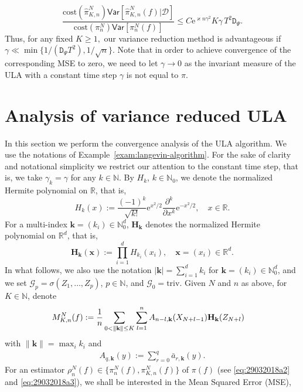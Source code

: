 \documentclass[bj]{imsart}
\def\PVar{\mathsf{Var}}
\def\nset{\mathbb{N}}
\def\rme{\mathrm{e}}
\def\TrainSet{\mathcal{D}}
\begin{document}
\begin{equation}
\label{eq:cost_theoretical}
\frac{\mathrm{cost}(\widehat \pi_{K,n}^N) \PVar[\widehat \pi_{K,n}^N(f)|\TrainSet]}{\mathrm{cost}(\pi_{n}^N)\PVar[\pi_{n}^N(f)]}\leq C \rme^{\varkappa n\gamma^2} K \gamma \, T^2 \mathtt{D}_\Psi.
\end{equation}
Thus, for any fixed $K\geq 1,$  our variance reduction method is advantageous if $\gamma\ll\min\{1/(\mathtt{D}_\Psi T^2),1/\sqrt{n}\}.$  Note that in order to achieve convergence of the corresponding MSE to zero, we need to let $\gamma\to 0$ as the invariant measure of the ULA with a constant time step $\gamma$ is not equal to $\pi.$
\section{Analysis of variance reduced ULA}\label{sec:ula_analysis}
In this section we perform the convergence analysis of the ULA algorithm. We use the notations of Example~\ref{exam:langevin-algorithm}. For the sake of clarity and notational simplicity we restrict our attention to the constant time step, that is, we take $\gamma_k =\gamma$ for any $k \in \nset$.
By $H_k$, $k\in\mathbb N_0$,
we denote the normalized Hermite polynomial on $\mathbb R$, that is,
$$
H_k(x):=\frac{(-1)^k}{\sqrt{k!}}\rme^{x^2/2}\frac{\partial^k}{\partial x^k}\rme^{-x^2/2},
\quad x\in\mathbb R.
$$
For a multi-index $\mathbf{k}=(k_i)\in\mathbb N_0^d$,
$\mathbf{H}_\mathbf{k}$ denotes the normalized Hermite polynomial on $\mathbb R^d$, that is,
$$
\mathbf{H}_\mathbf{k}(\mathbf{x}):=\prod_{i=1}^d H_{k_i}(x_i),\quad \mathbf{x}=(x_i)\in\mathbb R^d.
$$
In what follows, we also use the notation
$|\mathbf{k}|=\sum_{i=1}^d k_i$ for $\mathbf{k}=(k_i)\in\mathbb N_0^d$,
and we set $\mathcal G_p=\sigma(Z_1,\ldots,Z_p)$, $p\in\mathbb N$, and $\mathcal G_0=\mathrm{triv}$.
Given $N$ and $n$ as above, for $K\in\mathbb N$, denote
\begin{align}
M_{K,n}^N(f) & :=\frac{1}{n}\sum_{ 0<\|\mathbf{k}\|\le K}\sum_{l=1}^{n}A_{n-l,\mathbf{k}}(X_{N+l-1})\mathbf{H}_\mathbf{k}(Z_{N+l})
\label{eq:29032018a5}
\notag
\end{align}
with \(\|\mathbf{k}\|=\max_{i} k_i\) and
\begin{eqnarray}
\label{eq:A-ula}
A_{q,\mathbf{k}}(y):=\sum_{r=0}^{ q } \bar{a}_{r,\mathbf{k}}(y).
\end{eqnarray}
For an estimator $\rho_n^N(f)\in\{\pi_n^N(f),\pi_{K,n}^N(f)\}$
of $\pi(f)$ (see \eqref{eq:29032018a2} and \eqref{eq:29032018a3}), we shall be interested in the Mean Squared Error (MSE),
\end{document}

